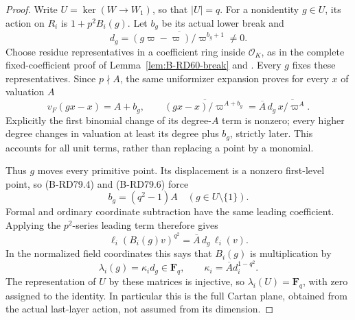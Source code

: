 \begin{proof}
Write \(U=\ker(W\to W_1)\), so that \(|U|=q\). For a
nonidentity \(g\in U\), its action on \(R_i\) is
\(1+p^2 B_i(g)\). Let \(b_g\) be its actual lower break and
\[
 d_g=\overline{(g\varpi-\varpi)/\varpi^{b_g+1}}\ne0.
\]
Choose residue representatives in a coefficient ring inside
\(\mathcal O_K\), as in the complete fixed-coefficient proof
of Lemma~\ref{lem:B-RD60-break} and
\cite[Theorem~10.160.8 and proof]{Stacks032A}.
Every \(g\) fixes these representatives. Since \(p\nmid A\),
the same uniformizer expansion proves for every \(x\) of
valuation \(A\)
\[
 v_F(gx-x)=A+b_g,\qquad
 \overline{(gx-x)/\varpi^{A+b_g}}
       =\overline A\,d_g\,\overline{x/\varpi^A}.
                                                     \tag{B-RD79.6}
\]
Explicitly the first binomial change of its degree-\(A\) term
is nonzero; every higher degree changes in valuation at least
its degree plus \(b_g\), strictly later. This accounts for
all unit terms, rather than replacing a point by a monomial.

Thus \(g\) moves every primitive point. Its displacement is a
nonzero first-level point, so (B-RD79.4) and (B-RD79.6) force
\[
          b_g=(q^2-1)A\quad(g\in U\setminus\{1\}).
                                                     \tag{B-RD79.7}
\]
Formal and ordinary coordinate subtraction have the same
leading coefficient. Applying the \(p^2\)-series leading term
therefore gives
\[
   \ell_i(B_i(g)v)^{q^2}
               =\overline A\,d_g\,\ell_i(v).
                                                     \tag{B-RD79.8}
\]
In the normalized field coordinates this says that \(B_i(g)\)
is multiplication by
\[
        \lambda_i(g)=\kappa_i d_g\in\mathbf F_q,
             \qquad \kappa_i=\overline A d_i^{1-q^2}.
                                                     \tag{B-RD79.9}
\]
The representation of \(U\) by these matrices is injective,
so \(\lambda_i(U)=\mathbf F_q\), with zero assigned to the
identity. In particular this is the full Cartan plane, obtained
from the actual last-layer action, not assumed from its dimension.


\end{proof}
